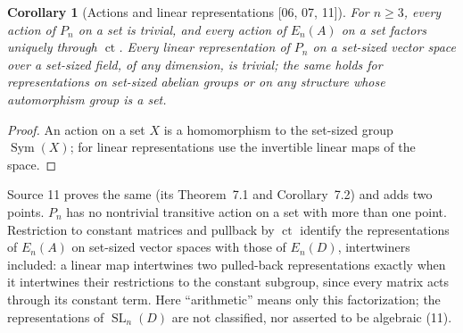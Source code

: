 \documentclass[11pt,oneside]{article}
\numberwithin{equation}{section}
\newtheorem{corollary}[corollary]{Corollary}
\theoremstyle{definition}
\theoremstyle{remark}
\newcommand{\ct}{\operatorname{ct}}
\newcommand{\SL}{\operatorname{SL}}
\newcommand{\Sym}{\operatorname{Sym}}
\newcommand{\src}[1]{\textup{\textsf{\small[#1]}}}
\begin{document}
\begin{corollary}[Actions and linear representations \src{06, 07, 11}]\label{ogl:el:cor:actions}
For $n\ge3$, every action of $P_n$ on a set is trivial, and every action of
$E_n(A)$ on a set factors uniquely through $\ct$. Every linear representation of
$P_n$ on a set-sized vector space over a set-sized field, of any dimension, is
trivial; the same holds for representations on set-sized abelian groups or on
any structure whose automorphism group is a set.
\end{corollary}
\begin{proof}
An action on a set $X$ is a homomorphism to the set-sized group $\Sym(X)$; for
linear representations use the invertible linear maps of the space.
\end{proof}

Source 11 proves the same (its Theorem~7.1 and Corollary~7.2) and adds two
points. $P_n$ has no nontrivial transitive action on a set with more than one
point. Restriction to constant matrices and pullback by $\ct$ identify the
representations of $E_n(A)$ on set-sized vector spaces with those of
$E_n(D)$, intertwiners included: a linear map intertwines two pulled-back
representations exactly when it intertwines their restrictions to the
constant subgroup, since every matrix acts through its constant term. Here
``arithmetic'' means only this factorization; the representations of
$\SL_n(D)$ are not classified, nor asserted to be algebraic (11).
\end{document}
